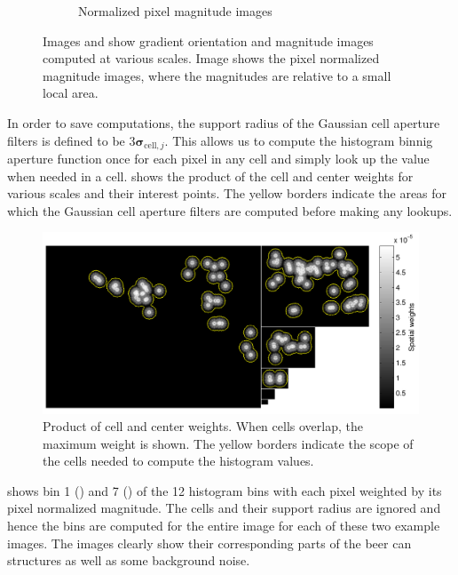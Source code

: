\documentclass[thesis.tex]{subfiles}
\def\sigmacellj{\boldsymbol{\sigma}_{\text{cell},j}}
\begin{document}
\begin{figure}[p]
\begin{subfigure}[t]{0.97\textwidth}
    	\caption{Normalized pixel magnitude images}
    	\label{fig:cellHistScaleSpacesMnorm}
	\end{subfigure}
	\caption{Images  and  show gradient orientation and magnitude images computed at various scales. Image  shows the pixel normalized magnitude images, where the magnitudes are relative to a small local area.}
	\label{fig:cellHistScaleSpacesVM}
\end{figure}
%
In order to save computations, the support radius of the Gaussian cell aperture filters is defined to be $3 \sigmacellj$. This allows us to compute the histogram binnig aperture function once for each pixel in any cell and simply look up the value when needed in a cell.  shows the product of the cell and center weights for various scales and their interest points. The yellow borders indicate the areas for which the Gaussian cell aperture filters are computed before making any lookups.
%
\begin{figure}[tb]
    \centering
    \includegraphics[width=\textwidth]{img/cellHistScaleSpacesSpatialWeights.pdf}
    \caption{Product of cell and center weights. When cells overlap, the maximum weight is shown. The yellow borders indicate the scope of the cells needed to compute the histogram values.}
    \label{fig:cellHistScaleSpacesSpatialWeights}
\end{figure}
%
 shows bin 1 () and 7 () of the 12 histogram bins with each pixel weighted by its pixel normalized magnitude. The cells and their support radius are ignored and hence the bins are computed for the entire image for each of these two example images. The images clearly show their corresponding parts of the beer can structures as well as some background noise.
\end{document}
